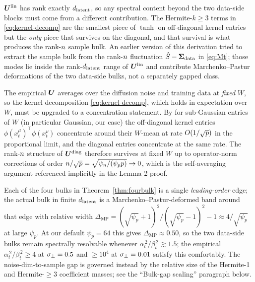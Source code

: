 \begin{remark}
$\bm{U}^{\mathrm{lin}}$ has rank exactly $d_{\mathrm{latent}}$, so any spectral
content beyond the two data-side blocks must come from a different
contribution. The Hermite-$k\!\ge\!3$ terms in \eqref{eq:kernel-decomp}
are the smallest piece of $\tanh$ on off-diagonal kernel entries but
the \emph{only} piece that survives on the diagonal, and that
survival is what produces the rank-$n$ sample bulk. An earlier
version of this derivation tried to extract the sample bulk from
the rank-$n$ fluctuation $\hat S - \bm{\Sigma}_{\mathrm{data}}$ in
\eqref{eq:Mt}; those modes lie inside the rank-$d_{\mathrm{latent}}$ range of
$\bm{U}^{\mathrm{lin}}$ and contribute Marchenko--Pastur deformations
of the two data-side bulks, not a separately gapped class.
\end{remark}

\begin{remark}
\label{rem:fixedW}
The empirical $\bm{U}$ averages over the diffusion noise and training
data at \emph{fixed} $W$, so the kernel decomposition
\eqref{eq:kernel-decomp}, which holds in expectation over $W$, must be
upgraded to a concentration statement. By
\citet{benigni2021eigenvalue} for sub-Gaussian entries of $W$ (in
particular Gaussian, our case) the off-diagonal kernel entries
$\phi(x_t^\mu)^\top\phi(x_t^\nu)$ concentrate around their $W$-mean
at rate $O(1/\sqrt{p})$ in the proportional limit, and the
diagonal entries concentrate at the same rate. The rank-$n$
structure of $\bm{U}^{\mathrm{diag}}$ therefore survives at fixed $W$
up to operator-norm corrections of order $n/\sqrt{p}=
\sqrt{\psi_n/(\psi_p p)}\to 0$, which is the self-averaging
argument referenced implicitly in the Lemma 2 proof.
\end{remark}

\begin{remark}
\label{rem:MP}
Each of the four bulks in Theorem~\ref{thm:fourbulk} is a single
\emph{leading-order} edge; the actual bulk in finite $d_{\mathrm{latent}}$ is a
Marchenko--Pastur-deformed band around that edge with relative width
$\Delta_{\mathrm{MP}} = (\sqrt{\psi_p}+1)^2/(\sqrt{\psi_p}-1)^2 - 1
\approx 4/\sqrt{\psi_p}$ at large $\psi_p$. At our default
$\psi_p = 64$ this gives $\Delta_{\mathrm{MP}}\approx 0.50$, so the
two data-side bulks remain spectrally resolvable whenever
$\alpha_t^{\,2}/\beta_t^{\,2}\gtrsim 1.5$; the empirical
$\alpha_t^{\,2}/\beta_t^{\,2}\ge 4$ at $\sigma_{\perp}=0.5$ and
$\ge 10^4$ at $\sigma_{\perp}=0.01$ satisfy this comfortably. The
noise-dim-to-sample gap is governed instead by the relative size of
the Hermite-1 and Hermite-$\ge 3$ coefficient masses; see the
``Bulk-gap scaling'' paragraph below.
\end{remark}

